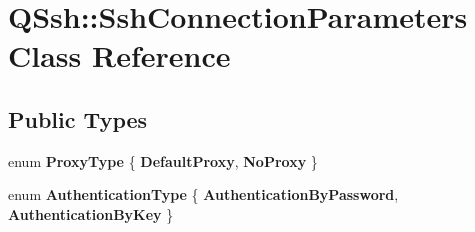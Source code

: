 \hypertarget{class_q_ssh_1_1_ssh_connection_parameters}{}\section{Q\+Ssh\+:\+:Ssh\+Connection\+Parameters Class Reference}
\label{class_q_ssh_1_1_ssh_connection_parameters}
\subsection*{Public Types}
\begin{DoxyCompactItemize}
\item 
\mbox{\label{class_q_ssh_1_1_ssh_connection_parameters_abd59790ce6e6d1ac8d55ae9d0dc936ac}} 
enum {\bfseries Proxy\+Type} \{ {\bfseries Default\+Proxy}, 
{\bfseries No\+Proxy}
 \}
\item 
\mbox{\label{class_q_ssh_1_1_ssh_connection_parameters_a669c2d4704524d5fbf1b7a3174cf190b}} 
enum {\bfseries Authentication\+Type} \{ {\bfseries Authentication\+By\+Password}, 
{\bfseries Authentication\+By\+Key}
 \}
\end{DoxyCompactItemize}
